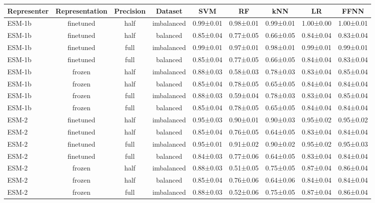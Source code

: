 \begin{tabular}{lcccccccc}
\toprule
 \textbf{Representer} & \textbf{Representation} & \textbf{Precision} &    \textbf{Dataset} &       \textbf{SVM} &        \textbf{RF} &       \textbf{kNN} &        \textbf{LR} &      \textbf{FFNN} \\
\midrule
      ESM-1b &      finetuned &      half & imbalanced & 0.99±0.01 & 0.98±0.01 & 0.99±0.01 & 1.00±0.00 & 1.00±0.01 \\
      ESM-1b &      finetuned &      half &   balanced & 0.85±0.04 & 0.77±0.05 & 0.66±0.05 & 0.84±0.04 & 0.83±0.04 \\
      ESM-1b &      finetuned &      full & imbalanced & 0.99±0.01 & 0.97±0.01 & 0.98±0.01 & 0.99±0.01 & 0.99±0.01 \\
      ESM-1b &      finetuned &      full &   balanced & 0.85±0.04 & 0.77±0.05 & 0.66±0.05 & 0.84±0.04 & 0.83±0.04 \\
      ESM-1b &         frozen &      half & imbalanced & 0.88±0.03 & 0.58±0.03 & 0.78±0.03 & 0.83±0.04 & 0.85±0.04 \\
      ESM-1b &         frozen &      half &   balanced & 0.85±0.04 & 0.78±0.05 & 0.65±0.05 & 0.84±0.04 & 0.84±0.04 \\
      ESM-1b &         frozen &      full & imbalanced & 0.88±0.03 & 0.59±0.04 & 0.78±0.03 & 0.83±0.04 & 0.85±0.04 \\
      ESM-1b &         frozen &      full &   balanced & 0.85±0.04 & 0.78±0.05 & 0.65±0.05 & 0.84±0.04 & 0.84±0.04 \\
       ESM-2 &      finetuned &      half & imbalanced & 0.95±0.03 & 0.90±0.01 & 0.90±0.03 & 0.95±0.02 & 0.95±0.02 \\
       ESM-2 &      finetuned &      half &   balanced & 0.85±0.04 & 0.76±0.05 & 0.64±0.05 & 0.83±0.04 & 0.84±0.04 \\
       ESM-2 &      finetuned &      full & imbalanced & 0.95±0.01 & 0.91±0.02 & 0.90±0.02 & 0.95±0.02 & 0.95±0.03 \\
       ESM-2 &      finetuned &      full &   balanced & 0.84±0.03 & 0.77±0.06 & 0.64±0.05 & 0.83±0.04 & 0.84±0.04 \\
       ESM-2 &         frozen &      half & imbalanced & 0.88±0.03 & 0.51±0.05 & 0.75±0.05 & 0.87±0.04 & 0.86±0.04 \\
       ESM-2 &         frozen &      half &   balanced & 0.85±0.04 & 0.76±0.06 & 0.64±0.06 & 0.84±0.04 & 0.84±0.04 \\
       ESM-2 &         frozen &      full & imbalanced & 0.88±0.03 & 0.52±0.06 & 0.75±0.05 & 0.87±0.04 & 0.86±0.04 \\

\end{tabular}
